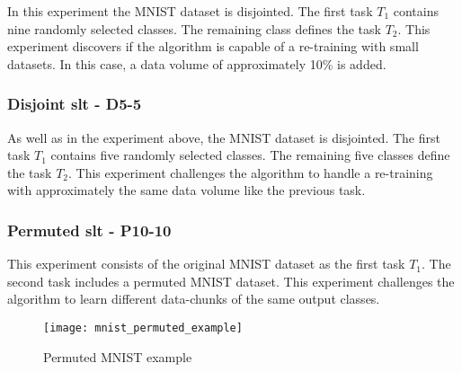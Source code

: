 In this experiment the MNIST dataset is disjointed.
The first task $T_1$ contains nine randomly selected classes.
The remaining class defines the task $T_2$.
\newline
This experiment discovers if the algorithm is capable of a re-training with small datasets.
In this case, a data volume of approximately 10\% is added.

\subsubsection*{Disjoint \acrshort{slt} - D5-5}

As well as in the experiment above, the MNIST dataset is disjointed.
The first task $T_1$ contains five randomly selected classes.
The remaining five classes define the task $T_2$.
\newline
This experiment challenges the algorithm to handle a re-training with approximately the same data volume like the previous task.

\subsubsection*{Permuted \acrshort{slt} - P10-10}

This experiment consists of the original MNIST dataset as the first task $T_1$.
The second task includes a permuted MNIST dataset.
\newline
This experiment challenges the algorithm to learn  different data-chunks of the same output classes.

\begin{figure}[H]
    \centering
    \texttt{[image: mnist\_permuted\_example]}
    \caption{Permuted MNIST example}
    \label{fig:intro_mnist_permuted_example}
\end{figure}